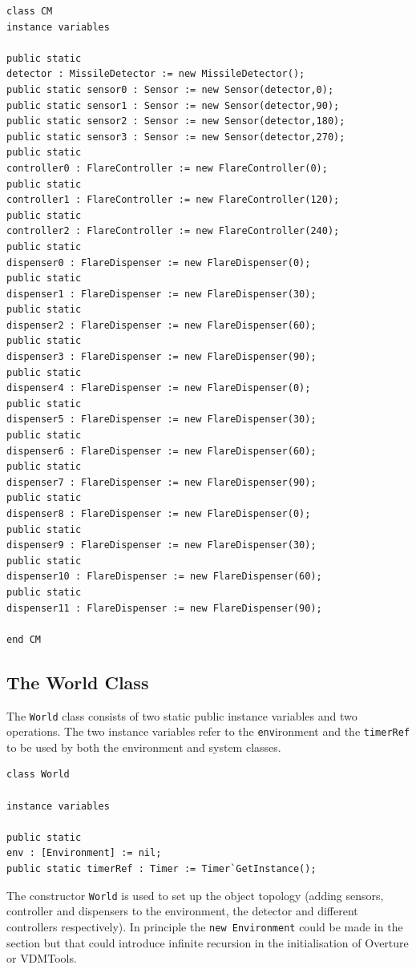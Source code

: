 \documentclass{overturerepchap}
\newcommand{\vdmtools}{VDMTools}
\begin{document}
\begin{lstlisting}
class CM
instance variables

public static 
detector : MissileDetector := new MissileDetector();
public static sensor0 : Sensor := new Sensor(detector,0);
public static sensor1 : Sensor := new Sensor(detector,90);
public static sensor2 : Sensor := new Sensor(detector,180);
public static sensor3 : Sensor := new Sensor(detector,270);
public static 
controller0 : FlareController := new FlareController(0);
public static 
controller1 : FlareController := new FlareController(120);
public static 
controller2 : FlareController := new FlareController(240);
public static 
dispenser0 : FlareDispenser := new FlareDispenser(0);
public static 
dispenser1 : FlareDispenser := new FlareDispenser(30);
public static 
dispenser2 : FlareDispenser := new FlareDispenser(60);
public static 
dispenser3 : FlareDispenser := new FlareDispenser(90);
public static 
dispenser4 : FlareDispenser := new FlareDispenser(0);
public static 
dispenser5 : FlareDispenser := new FlareDispenser(30);
public static 
dispenser6 : FlareDispenser := new FlareDispenser(60);
public static 
dispenser7 : FlareDispenser := new FlareDispenser(90);
public static 
dispenser8 : FlareDispenser := new FlareDispenser(0);
public static 
dispenser9 : FlareDispenser := new FlareDispenser(30);
public static 
dispenser10 : FlareDispenser := new FlareDispenser(60);
public static 
dispenser11 : FlareDispenser := new FlareDispenser(90);

end CM
\end{lstlisting}

\subsection{The World Class}

The \texttt{World} class consists of two static public instance variables and
two operations. The two instance variables refer to the \texttt{env}ironment
and the \texttt{timerRef} to be used by both the environment and system
classes. 

\begin{lstlisting}
class World

instance variables
  
public static 
env : [Environment] := nil;
public static timerRef : Timer := Timer`GetInstance();
\end{lstlisting}

The constructor \texttt{World} is used to set
up the object topology (adding sensors, controller and dispensers to 
the environment, the detector and different controllers respectively).
In principle the \texttt{new Environment} could be made in the 
{\bf{}} section but that could introduce infinite 
recursion in the initialisation of Overture or \vdmtools.
\end{document}
